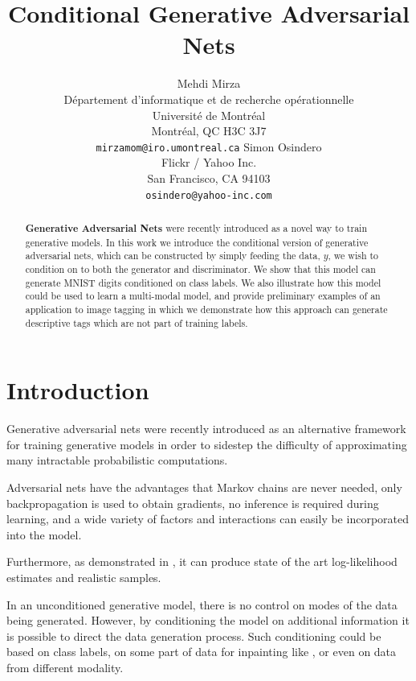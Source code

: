\documentclass{article} %
\title{Conditional Generative Adversarial Nets}
\author{
Mehdi Mirza \\
D\'epartement d'informatique et de recherche op\'erationnelle\\
Universit\'e de Montr\'eal\\
Montr\'eal, QC H3C 3J7 \\
\texttt{mirzamom@iro.umontreal.ca}
\AND
Simon Osindero \\
Flickr / Yahoo Inc. \\
San Francisco, CA 94103 \\
\texttt{osindero@yahoo-inc.com} \\
}
\begin{document}
\maketitle

\begin{abstract}
\textbf{Generative Adversarial Nets} \cite{Goodfellow-et-al-NIPS2014-small} were recently introduced as a novel
way to train generative models. In this work we introduce the conditional
version of generative adversarial nets, which can be constructed by simply feeding
the data, ${y}$, we wish to condition on to both the generator and discriminator.
We show that this model can generate MNIST digits conditioned on class labels.
We also illustrate how this model could be used to learn a multi-modal model, and provide
preliminary examples of an application to image tagging in which we demonstrate
how this approach can generate descriptive tags which are not part of training labels.
\end{abstract}

\section{Introduction}

Generative adversarial nets were recently introduced as an alternative framework for training
generative models in order to sidestep the difficulty of approximating many intractable probabilistic
computations.

Adversarial nets have the advantages that Markov chains
are never needed, only backpropagation is used to obtain gradients,
no inference is required during learning,
and a wide variety of factors and interactions can easily be incorporated into the model.

Furthermore, as demonstrated in \cite{Goodfellow-et-al-NIPS2014-small},
it can produce state of the art log-likelihood estimates and realistic samples.

In an unconditioned generative model, there is no control on modes of the data being generated.
However, by conditioning the model on additional information it is possible to direct the data
generation process. Such conditioning could be based on class labels, on some part of data
for inpainting like \cite{goodfellow2013multi}, or even on data from different modality.
\end{document}
